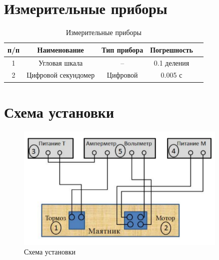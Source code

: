 \section{Измерительные приборы}
\begin{table}[H]
	\centering
	\begin{tabular}{| c | c | c | c | c |}
		\hline
		\textnumero п/п & Наименование        & Тип прибора & Погрешность \\
		\hline
		1               & Угловая шкала       & --          & 0.1 деления \\
		\hline
		2               & Цифровой секундомер & Цифровой    & 0.005 с     \\
		\hline
	\end{tabular}
	\caption{Измерительные приборы}
\end{table}

\section{Схема установки}
\begin{figure}[H]
	\centering
	\includegraphics[width=0.9\textwidth]{img/scheme.png}
	\caption{Схема установки}
\end{figure}
